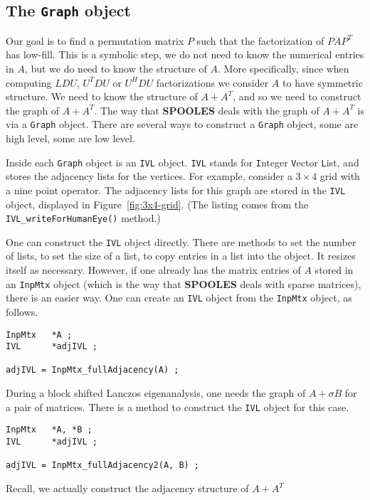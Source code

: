 \subsection{The {\tt Graph} object}
\label{subsection:graph}
\par
Our goal is to find a permutation matrix $P$ such that the
factorization of $PAP^T$ has low-fill.
This is a symbolic step, we do not need to know the numerical
entries in $A$, but we do need to know the structure of $A$.
More specifically, since 
when computing $LDU$, $U^TDU$ or $U^HDU$ factorizations
we consider $A$ to have symmetric structure.
We need to know the structure of $A + A^T$,
and so we need to construct the graph of $A+A^T$.
The way that {\bf SPOOLES} deals with the graph of $A + A^T$ is 
via a {\tt Graph} object.
There are several ways to construct a {\tt Graph} object,
some are high level, some are low level.
\par
Inside each {\tt Graph} object is an {\tt IVL} object.
{\tt IVL} stands for {\tt I}nteger {\tt V}ector {\tt L}ist,
and stores the adjacency lists for the vertices.
For example, consider a $3 \times 4$ grid with a nine point operator.
The adjacency lists for this graph are stored in the {\tt IVL}
object, displayed in Figure~\ref{fig:3x4-grid}.
(The listing comes from the {\tt IVL\_writeForHumanEye()} method.)
\par

\par
One can construct the {\tt IVL} object directly.
There are methods to set the number of lists,
to set the size of a list,
to copy entries in a list into the object.
It resizes itself as necessary.
However, if one already has the matrix entries of $A$ stored in an
{\tt InpMtx} object (which is the way that {\bf SPOOLES} deals with
sparse matrices), there is an easier way.
One can create an {\tt IVL} object from the {\tt InpMtx} object,
as follows.
\begin{verbatim}
InpMtx   *A ;
IVL      *adjIVL ;

adjIVL = InpMtx_fullAdjacency(A) ;
\end{verbatim}
During a block shifted Lanczos eigenanalysis, one needs the graph
of $A + \sigma B$ for a pair of matrices.
There is a method to construct the {\tt IVL} object for this case.
\begin{verbatim}
InpMtx   *A, *B ;
IVL      *adjIVL ;

adjIVL = InpMtx_fullAdjacency2(A, B) ;
\end{verbatim}
Recall, we actually construct the adjacency structure of $A + A^T$
